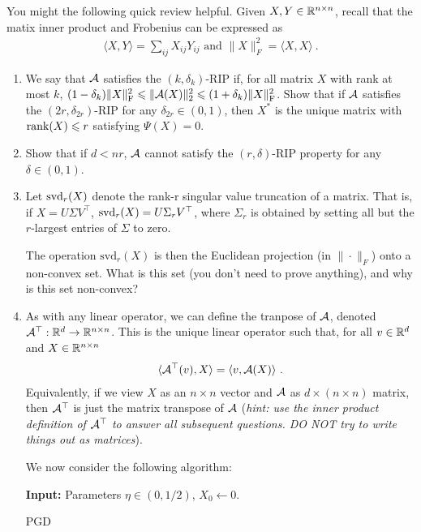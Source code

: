 \documentclass[12pt]{article}
\begin{document}
	You might the following quick review helpful. Given $X,Y \in \mathbb{R}^{n \times n}$, recall that the matix inner product and Frobenius can be expressed as
	\begin{eqnarray}
	\langle X, Y \rangle = \sum_{ij} X_{ij}Y_{ij} \text{ and } \|X\|_F^2 = \langle X,X\rangle~.
	\end{eqnarray}
	

	\begin{enumerate}
		\item We say that ${\cal A}$ satisfies the $(k,\delta_k)$-RIP if, for all matrix $X$ with rank at most $k$, $(1-\delta_k) \|X\|_{\mathrm{F}}^2 \leqslant\|{\cal A}(X)\|_2^2 \leqslant (1+\delta_k)\|X\|_{\mathrm{F}}^2$. 
		Show that if ${\cal A}$ satisfies the $(2r,\delta_{2r})$-RIP  for any $\delta_{2r} \in (0,1)$, then $X^*$ is the unique matrix with $\mathrm{rank}(X) \leqslant r$ satisfying $\Psi(X) = 0$.


		\item Show that if $d < nr$, ${\cal A}$ cannot satisfy the $(r,\delta)$-RIP property for any $\delta \in (0,1)$. 
		\item Let ${\mathrm{svd}}_r(X)$ denote the rank-r singular value truncation of a matrix. That is, if $X = U\Sigma V^{\top}$, ${\mathrm{svd}}_r(X) = U\Sigma_r V^{\top}$, where $\Sigma_r$ is obtained by setting all but the $r$-largest entries of $\Sigma$ to zero.

		The operation $\mathrm{svd}_r(X)$ is then the Euclidean projection (in $\|\cdot\|_F$) onto a non-convex set. What is this set (you don't need to prove anything), and why is this set non-convex? 

		\item As with any linear operator, we can define the tranpose of ${\cal A}$, denoted ${\cal A}^\top : \mathbb{R}^d \to \mathbb{R}^{n \times n}$. This is the unique linear operator such that, for all $v \in \mathbb{R}^d$ and $X \in \mathbb{R}^{n \times n}$
		\begin{eqnarray}
		\langle {\cal A}^\top(v), X \rangle = \langle v, {\cal A}(X) \rangle~.
		\end{eqnarray}
		Equivalently, if we view $X$ as an $n \times n$ vector and ${\cal A}$ as $d \times (n \times n)$ matrix, then ${\cal A}^{\top}$ is just the matrix transpose of ${\cal A}$ (\emph{hint: use the inner product definition of ${\cal A}^\top$ to answer all subsequent questions. DO NOT try to write things out as matrices}).

		We now consider the following algorithm:
		\begin{algorithm}
		\SetAlgoLined
		\textbf{Input:} Parameters $\eta \in (0,1/2)$, $X_0 \leftarrow 0$.
		\caption{PGD}\label{algPGD}
		\end{algorithm}



\end{enumerate}
\end{document}
